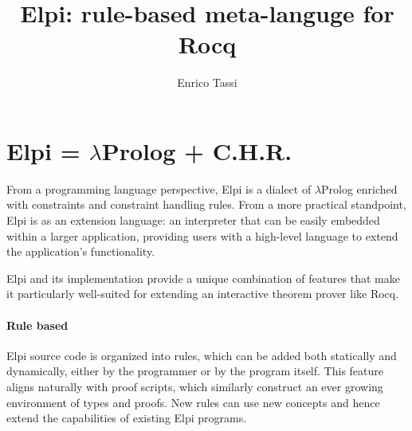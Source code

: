 \documentclass[sigplan,natbib=false]{acmart}
\author{Enrico Tassi}
\affiliation{%
    \institution{Université Côte d'Azur, Inria}
    \country{France}
}
\title{Elpi: rule-based meta-languge for Rocq}
\begin{document}
\maketitle

\section{Elpi = $\lambda$Prolog + C.H.R.}

% 

From a programming language perspective, Elpi is a dialect of $\lambda$Prolog
enriched with constraints and constraint handling rules. From a more practical
standpoint, Elpi is as an extension language: an interpreter that can be easily
embedded within a larger application, providing users with a high-level
language to extend the application's functionality.

Elpi and its implementation provide a unique combination of features that make
it particularly well-suited for extending an interactive theorem prover like
Rocq.

\paragraph{Rule based}

Elpi source code is organized into rules, which can be added both statically
and dynamically, either by the programmer or by the program itself. This
feature aligns naturally with proof scripts, which similarly construct an ever
growing environment of types and proofs. New rules can use new concepts and
hence extend the capabilities of existing Elpi programs.
\end{document}
